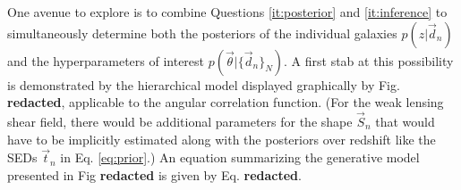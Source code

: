 \documentclass[12pt, onecolumn]{emulateapj}
\begin{document}
One avenue to explore is to combine Questions \ref{it:posterior} and \ref{it:inference} to simultaneously determine both the posteriors of the individual galaxies $p(z|\vec{d}_{n})$ and the hyperparameters of interest $p(\vec{\theta}|\{\vec{d}_{n}\}_{N})$.  A first stab at this possibility is demonstrated by the hierarchical model displayed graphically by Fig. \textbf{redacted}, applicable to the angular correlation function.  (For the weak lensing shear field, there would be additional parameters for the shape $\vec{S}_{n}$ that would have to be implicitly estimated along with the posteriors over redshift like the SEDs $\vec{t}_{n}$ in Eq. \ref{eq:prior}.)  An equation summarizing the generative model presented in Fig \textbf{redacted} is given by Eq. \textbf{redacted}.

%
%
%
\end{document}
